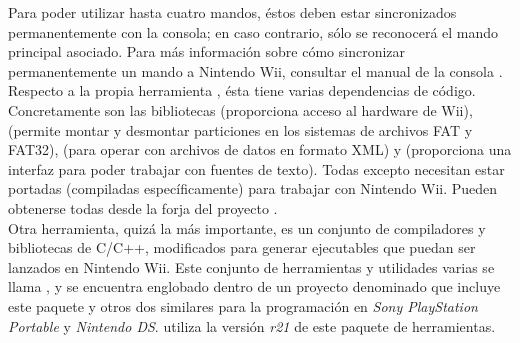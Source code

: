 Para poder utilizar hasta cuatro mandos, éstos deben estar sincronizados permanentemente con la consola; en caso contrario, sólo se reconocerá el mando principal asociado. Para más información sobre cómo sincronizar permanentemente un mando a Nintendo Wii, consultar el manual de la consola \cite{website:manualoficial}.\\

Respecto a la propia herramienta , ésta tiene varias dependencias de código. Concretamente son las bibliotecas  (proporciona acceso al hardware de Wii),  (permite montar y desmontar particiones en los sistemas de archivos FAT y FAT32),  (para operar con archivos de datos en formato XML) y  (proporciona una interfaz para poder trabajar con fuentes de texto). Todas excepto  necesitan estar portadas (compiladas específicamente) para trabajar con Nintendo Wii. Pueden obtenerse todas desde la forja del proyecto \cite{website:forja}.\\

Otra herramienta, quizá la más importante, es un conjunto de compiladores y bibliotecas de C/C++, modificados para generar ejecutables que puedan ser lanzados en Nintendo Wii. Este conjunto de herramientas y utilidades varias se llama , y se encuentra englobado dentro de un proyecto denominado  \cite{website:devkitpro} que incluye este paquete y otros dos similares para la programación en \emph{Sony PlayStation Portable} y \emph{Nintendo DS}.  utiliza la versión \emph{r21} de este paquete de herramientas.

